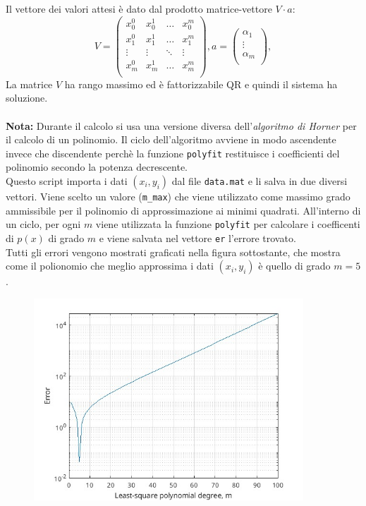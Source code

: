 \documentclass[10pt,a4paper]{article}
\begin{document}
Il vettore dei valori attesi è dato dal prodotto matrice-vettore $V\cdot a$:
$$V = \begin{pmatrix}
x_0^0 & x_0^1 &\dots & x_0^m\\
x_1^0 & x_1^1 &\dots & x_1^m\\
\vdots &\vdots &\ddots &\vdots\\
x_m^0 & x_m^1 &\dots & x_m^m\\
\end{pmatrix}, a=\begin{pmatrix}
  \alpha_{1}\\
  \vdots \\
  \alpha_{m} \\
\end{pmatrix},$$
La matrice $V$ ha rango massimo ed è fattorizzabile QR e quindi il sistema ha soluzione.\\\\

\textbf{Nota:} Durante il calcolo si usa una versione diversa dell'\textit{algoritmo di Horner} per il calcolo di un polinomio. Il ciclo dell'algoritmo avviene in modo ascendente invece che discendente perchè la funzione \texttt{polyfit} restituisce i coefficienti del polinomio secondo la potenza decrescente.\\

Questo script importa i dati $(x_i,y_i)$ dal file \texttt{data.mat} e li salva in due  diversi vettori. Viene scelto un valore (\texttt{m\_max}) che viene utilizzato come massimo grado ammissibile per il polinomio di approssimazione ai minimi quadrati. All'interno di un ciclo, per ogni $m$ viene utilizzata la funzione \texttt{polyfit} per calcolare i coefficenti di $p(x)$ di grado $m$ e viene salvata nel vettore \texttt{er} l'errore trovato.\\Tutti gli errori vengono mostrati graficati nella figura sottostante, che mostra come il polionomio che meglio approssima i dati $(x_i,y_i)$ è quello di grado $m=5$.
\begin{figure}[h!]
  \centering
  \includegraphics[width=0.9\textwidth]{../figure/esercizio_24}  
\end{figure}
\clearpage
\end{document}
